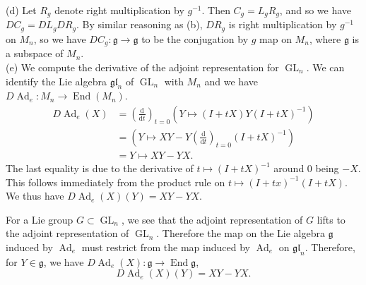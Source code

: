 \documentclass{amsart}
\numberwithin{equation}{section}
\theoremstyle{plain}
\theoremstyle{definition}
\theoremstyle{remark}
\newcommand{\g}{\mathfrak{g}}
\newcommand{\gl}{\mathfrak{gl}}
\renewcommand{\_}[2]{\underbrace{#1}_{#2}}
\renewcommand{\^}[2]{\overbrace{#1}_{#2}}
\newcommand{\Ad}{\operatorname{Ad}}
\newcommand{\End}{\operatorname{End}}
\newcommand{\GL}{\operatorname{GL}}
\renewcommand{\d}{\mathrm{d}}
\renewcommand{\Ad}{\operatorname{Ad}}
\begin{document}
(d) Let $R_g$ denote right multiplication by $g^{-1}$. Then $C_g = L_gR_g$, and so we have $DC_g = DL_g DR_g$. By similar reasoning as (b), $DR_g$ is right multiplication by $g^{-1}$ on $M_n$, so we have $DC_g: \g \to \g$ to be the conjugation by $g$ map on $M_n$, where $\g$ is a subspace of $M_n$.\\

(e) We compute the derivative of the adjoint representation for $\GL_n$. We can identify the Lie algebra $\gl_n$ of $\GL_n$ with $M_n$ and we have $D\Ad_e: M_n \to \End(M_n)$. 
\begin{align*}
  D\Ad_e(X) &= \left(\frac{\d }{\d t}\right)_{t=0} \left (Y \mapsto (I+tX) Y(I+tX)^{-1}\right ) \\
            &= \left(Y \mapsto XY - Y\left(\frac{\d }{\d t}\right)_{t=0}(I+tX)^{-1}\right) \\
            &= Y \mapsto XY - YX.
\end{align*}
The last equality is due to the derivative of $t\mapsto (I+tX)^{-1}$ around $0$ being $-X$. This follows immediately from the product rule on $t\mapsto (I+tx)^{-1}(I+tX)$. We thus have $D\Ad_e(X)(Y) = XY - YX$.

For a Lie group $G \subset \GL_n$, we see that the adjoint representation of $G$ lifts to the adjoint representation of $\GL_n$. Therefore the map on the Lie algebra $\g$ induced by $\Ad_e$ must restrict from the map induced by $\Ad_e$ on $\gl_n$. Therefore, for $Y \in \g$, we have $D\Ad_e(X):\g \to \End \g$, $$D\Ad_e(X)(Y) = XY - YX.$$
\end{document}
